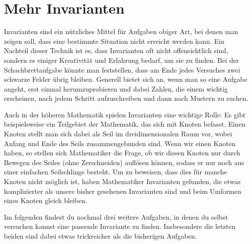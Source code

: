 \documentclass[a4paper,ngerman,12pt]{scrartcl}
\theoremstyle{definition}
\theoremstyle{plain}
\theoremstyle{remark}
\begin{document}
\section{Mehr Invarianten}

Invarianten sind ein nützliches Mittel für Aufgaben obiger Art, bei denen man zeigen soll, dass eine bestimmte Situation nicht erreicht werden kann. Ein Nachteil dieser Technik ist es, dass Invarianten oft nicht offensichtlich sind, sondern es einiger Kreativität und Erfahrung bedarf, um sie zu finden. Bei der Schachbrettaufgabe könnte man feststellen, dass am Ende jedes Versuches zwei schwarze Felder übrig bleiben. Generell bietet sich an, wenn man so eine Aufgabe angeht, erst einmal herumzuprobieren und dabei Zahlen, die einem wichtig erscheinen, nach jedem Schritt aufzuschreiben und dann nach Mustern zu suchen.

Auch in der höheren Mathematik spielen Invarianten eine wichtige Rolle: Es gibt beispielsweise ein Teilgebiet der Mathematik, das sich mit Knoten befasst. Einen Knoten stellt man sich dabei als Seil im dreidimensionalen Raum vor, wobei Anfang und Ende des Seils zusammengebunden sind. Wenn wir einen Knoten haben, so stellen sich Mathematiker die Frage, ob wir diesen Knoten nur durch Bewegen des Seiles (ohne Zerschneiden) auflösen können, sodass er nur noch aus einer einfachen Seilschlinge besteht. Um zu beweisen, dass dies für manche Knoten nicht möglich ist, haben Mathematiker Invarianten gefunden, die etwas komplizierter als unsere bisher gesehenen Invarianten sind und beim Umformen eines Knoten gleich bleiben.

Im folgenden findest du nochmal drei weitere Aufgaben, in denen du selbst versuchen kannst eine passende Invariante zu finden. Insbesondere die letzten beiden sind dabei etwas trickreicher als die bisherigen Aufgaben.

\newpage 
\end{document}
